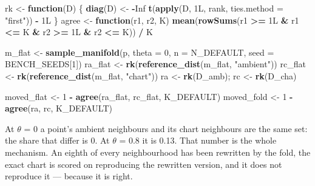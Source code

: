 \documentclass[
  british,
  a4paper,
]{book}
\newenvironment{Shaded}{\begin{snugshade}}{\end{snugshade}}
\newcommand{\AttributeTok}[1]{\textcolor[rgb]{0.13,0.29,0.53}{#1}}
\newcommand{\ConstantTok}[1]{\textcolor[rgb]{0.56,0.35,0.01}{#1}}
\newcommand{\ControlFlowTok}[1]{\textcolor[rgb]{0.13,0.29,0.53}{\textbf{#1}}}
\newcommand{\DataTypeTok}[1]{\textcolor[rgb]{0.13,0.29,0.53}{#1}}
\newcommand{\DecValTok}[1]{\textcolor[rgb]{0.00,0.00,0.81}{#1}}
\newcommand{\FunctionTok}[1]{\textcolor[rgb]{0.13,0.29,0.53}{\textbf{#1}}}
\newcommand{\NormalTok}[1]{#1}
\newcommand{\OtherTok}[1]{\textcolor[rgb]{0.56,0.35,0.01}{#1}}
\newcommand{\SpecialCharTok}[1]{\textcolor[rgb]{0.81,0.36,0.00}{\textbf{#1}}}
\newcommand{\StringTok}[1]{\textcolor[rgb]{0.31,0.60,0.02}{#1}}
\begin{document}
\begin{Shaded}
\begin{Highlighting}[]
\NormalTok{rk }\OtherTok{\textless{}{-}} \ControlFlowTok{function}\NormalTok{(D) \{ }\FunctionTok{diag}\NormalTok{(D) }\OtherTok{\textless{}{-}} \SpecialCharTok{{-}}\ConstantTok{Inf}
                    \FunctionTok{t}\NormalTok{(}\FunctionTok{apply}\NormalTok{(D, }\DecValTok{1}\DataTypeTok{L}\NormalTok{, rank, }\AttributeTok{ties.method =} \StringTok{"first"}\NormalTok{)) }\SpecialCharTok{{-}} \DecValTok{1}\DataTypeTok{L}\NormalTok{ \}}
\NormalTok{agree }\OtherTok{\textless{}{-}} \ControlFlowTok{function}\NormalTok{(r1, r2, K) }\FunctionTok{mean}\NormalTok{(}\FunctionTok{rowSums}\NormalTok{(r1 }\SpecialCharTok{\textgreater{}=} \DecValTok{1}\DataTypeTok{L} \SpecialCharTok{\&}\NormalTok{ r1 }\SpecialCharTok{\textless{}=}\NormalTok{ K }\SpecialCharTok{\&}\NormalTok{ r2 }\SpecialCharTok{\textgreater{}=} \DecValTok{1}\DataTypeTok{L} \SpecialCharTok{\&}\NormalTok{ r2 }\SpecialCharTok{\textless{}=}\NormalTok{ K)) }\SpecialCharTok{/}\NormalTok{ K}

\NormalTok{m\_flat  }\OtherTok{\textless{}{-}} \FunctionTok{sample\_manifold}\NormalTok{(p, }\AttributeTok{theta =} \DecValTok{0}\NormalTok{, }\AttributeTok{n =}\NormalTok{ N\_DEFAULT, }\AttributeTok{seed =}\NormalTok{ BENCH\_SEEDS[}\DecValTok{1}\NormalTok{])}
\NormalTok{ra\_flat }\OtherTok{\textless{}{-}} \FunctionTok{rk}\NormalTok{(}\FunctionTok{reference\_dist}\NormalTok{(m\_flat, }\StringTok{"ambient"}\NormalTok{))}
\NormalTok{rc\_flat }\OtherTok{\textless{}{-}} \FunctionTok{rk}\NormalTok{(}\FunctionTok{reference\_dist}\NormalTok{(m\_flat, }\StringTok{"chart"}\NormalTok{))}
\NormalTok{ra }\OtherTok{\textless{}{-}} \FunctionTok{rk}\NormalTok{(D\_amb); rc }\OtherTok{\textless{}{-}} \FunctionTok{rk}\NormalTok{(D\_cha)}

\NormalTok{moved\_flat }\OtherTok{\textless{}{-}} \DecValTok{1} \SpecialCharTok{{-}} \FunctionTok{agree}\NormalTok{(ra\_flat, rc\_flat, K\_DEFAULT)}
\NormalTok{moved\_fold }\OtherTok{\textless{}{-}} \DecValTok{1} \SpecialCharTok{{-}} \FunctionTok{agree}\NormalTok{(ra, rc, K\_DEFAULT)}
\end{Highlighting}
\end{Shaded}

At \(\theta\) = 0 a point's ambient neighbours and its chart neighbours are
the same set: the share that differ is 0. At \(\theta\) =
0.8 it is 0.13. That number is the whole mechanism.
An eighth of every neighbourhood has been rewritten by the fold, the exact chart
is scored on reproducing the rewritten version, and it does not reproduce it ---
because it is right.
\end{document}
